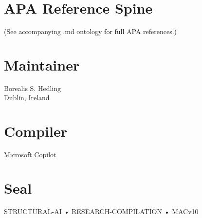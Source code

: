\documentclass[11pt]{article}
\begin{document}
\section{APA Reference Spine}
(See accompanying .md ontology for full APA references.)

\section{Maintainer}
Borealis S. Hedling \\
Dublin, Ireland

\section{Compiler}
Microsoft Copilot

\section{Seal}
STRUCTURAL-AI • RESEARCH-COMPILATION • MACv10
\end{document}
